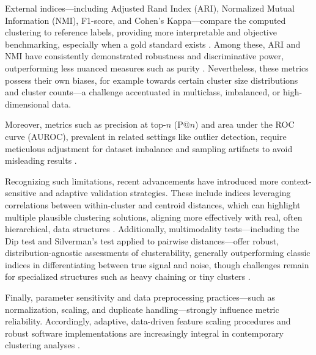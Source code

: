 \documentclass[sigconf]{acmart}
\begin{document}
External indices—including Adjusted Rand Index (ARI), Normalized Mutual Information (NMI), F1-score, and Cohen’s Kappa—compare the computed clustering to reference labels, providing more interpretable and objective benchmarking, especially when a gold standard exists \cite{ref14,ref16,ref17,ref21,ref22,ref44,ref45,ref46,ref50,ref67,ref72,ref75,ref77,ref78,ref90,ref93,ref94,ref95,ref96,ref97,ref100,ref113}. Among these, ARI and NMI have consistently demonstrated robustness and discriminative power, outperforming less nuanced measures such as purity \cite{ref17,ref44}. Nevertheless, these metrics possess their own biases, for example towards certain cluster size distributions and cluster counts—a challenge accentuated in multiclass, imbalanced, or high-dimensional data.

Moreover, metrics such as precision at top-$n$ (P@$n$) and area under the ROC curve (AUROC), prevalent in related settings like outlier detection, require meticulous adjustment for dataset imbalance and sampling artifacts to avoid misleading results \cite{ref14}.

Recognizing such limitations, recent advancements have introduced more context-sensitive and adaptive validation strategies. These include indices leveraging correlations between within-cluster and centroid distances, which can highlight multiple plausible clustering solutions, aligning more effectively with real, often hierarchical, data structures \cite{ref17}. Additionally, multimodality tests—including the Dip test and Silverman’s test applied to pairwise distances—offer robust, distribution-agnostic assessments of clusterability, generally outperforming classic indices in differentiating between true signal and noise, though challenges remain for specialized structures such as heavy chaining or tiny clusters \cite{ref94,ref95}.

Finally, parameter sensitivity and data preprocessing practices—such as normalization, scaling, and duplicate handling—strongly influence metric reliability. Accordingly, adaptive, data-driven feature scaling procedures and robust software implementations are increasingly integral in contemporary clustering analyses \cite{ref95,ref96}.
\end{document}
